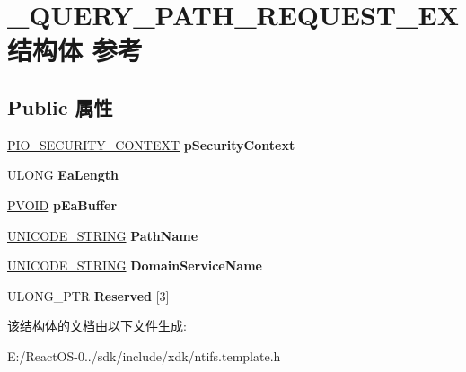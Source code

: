 \hypertarget{struct___q_u_e_r_y___p_a_t_h___r_e_q_u_e_s_t___e_x}{}\section{\+\_\+\+Q\+U\+E\+R\+Y\+\_\+\+P\+A\+T\+H\+\_\+\+R\+E\+Q\+U\+E\+S\+T\+\_\+\+E\+X结构体 参考}
\label{struct___q_u_e_r_y___p_a_t_h___r_e_q_u_e_s_t___e_x}
\subsection*{Public 属性}
\begin{DoxyCompactItemize}
\item 
\mbox{\label{struct___q_u_e_r_y___p_a_t_h___r_e_q_u_e_s_t___e_x_a48909cf3b6f7fbabb89ea855dcc8a577}} 
\hyperlink{struct___i_o___s_e_c_u_r_i_t_y___c_o_n_t_e_x_t}{P\+I\+O\+\_\+\+S\+E\+C\+U\+R\+I\+T\+Y\+\_\+\+C\+O\+N\+T\+E\+XT} {\bfseries p\+Security\+Context}
\item 
\mbox{\label{struct___q_u_e_r_y___p_a_t_h___r_e_q_u_e_s_t___e_x_a0dbf472663c26be876e1aa895c633c22}} 
U\+L\+O\+NG {\bfseries Ea\+Length}
\item 
\mbox{\label{struct___q_u_e_r_y___p_a_t_h___r_e_q_u_e_s_t___e_x_a393242e3a15a63586e23db9ee2eec105}} 
\hyperlink{interfacevoid}{P\+V\+O\+ID} {\bfseries p\+Ea\+Buffer}
\item 
\mbox{\label{struct___q_u_e_r_y___p_a_t_h___r_e_q_u_e_s_t___e_x_a73cf1828c7fc0bac1476c6ae5faa8a1b}} 
\hyperlink{struct___u_n_i_c_o_d_e___s_t_r_i_n_g}{U\+N\+I\+C\+O\+D\+E\+\_\+\+S\+T\+R\+I\+NG} {\bfseries Path\+Name}
\item 
\mbox{\label{struct___q_u_e_r_y___p_a_t_h___r_e_q_u_e_s_t___e_x_ad6e2b999b9ba1cc365ace42571c73b8f}} 
\hyperlink{struct___u_n_i_c_o_d_e___s_t_r_i_n_g}{U\+N\+I\+C\+O\+D\+E\+\_\+\+S\+T\+R\+I\+NG} {\bfseries Domain\+Service\+Name}
\item 
\mbox{\label{struct___q_u_e_r_y___p_a_t_h___r_e_q_u_e_s_t___e_x_a7eb121a2c3d458f3bc07e2aae9ffb52e}} 
U\+L\+O\+N\+G\+\_\+\+P\+TR {\bfseries Reserved} \mbox{[}3\mbox{]}
\end{DoxyCompactItemize}


该结构体的文档由以下文件生成\+:\begin{DoxyCompactItemize}
\item 
E\+:/\+React\+O\+S-\/0../sdk/include/xdk/ntifs.\+template.\+h\end{DoxyCompactItemize}
